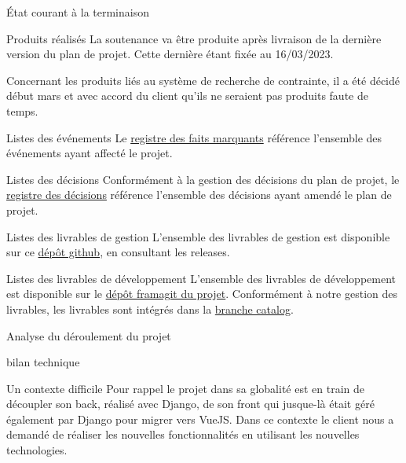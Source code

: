 \documentclass[]{article}
\begin{document}
{\begin{section}{État courant à la terminaison}
\begin{subsection}{Produits réalisés}
     La soutenance va être produite après livraison de la dernière version du plan de projet. Cette dernière étant fixée au 16/03/2023.

     Concernant les produits liés au système de recherche de contrainte, il a été décidé début mars et avec accord du client qu’ils ne seraient pas produits faute de temps.
 \end{subsection}

 \begin{subsection}{Listes des événements}
     Le \href{Registre_des_faits_marquants.pdf}{registre des faits marquants} référence l'ensemble des événements ayant affecté le projet.
 \end{subsection}

 \begin{subsection}{Listes des décisions}
     Conformément à la gestion des décisions du plan de projet, le \href{Registre_des_décisions.pdf}{registre des décisions} référence l'ensemble des décisions ayant amendé le plan de projet.
 \end{subsection}

 \begin{subsection}{Listes des livrables de gestion}
     L'ensemble des livrables de gestion est disponible sur ce \href{https://github.com/Szyckaa/UE-PROJET-DOCS-GESTION}{dépôt github}, en consultant les releases.
 \end{subsection}

 \begin{subsection}{Listes des livrables de développement}
     L'ensemble des livrables de développement est disponible sur le \href{https://framagit.org/flopedt/FlOpEDT}{dépôt framagit du projet}. Conformément à notre gestion des livrables, les livrables sont intégrés dans la \href{https://framagit.org/flopedt/FlOpEDT/-/tree/catalog}{branche catalog}.
 \end{subsection}
\end{section}

\begin{section}{Analyse du déroulement du projet}
 \begin{subsection}{bilan technique}
     \begin{subsubsection}{Un contexte difficile}
         Pour rappel le projet dans sa globalité est en train de découpler son back, réalisé avec Django, de son front qui jusque-là était géré également par Django pour migrer vers VueJS. Dans ce contexte le client nous a demandé de réaliser les nouvelles fonctionnalités en utilisant les nouvelles technologies.


\end{subsubsection}
\end{subsection}
\end{section}}
\end{document}
